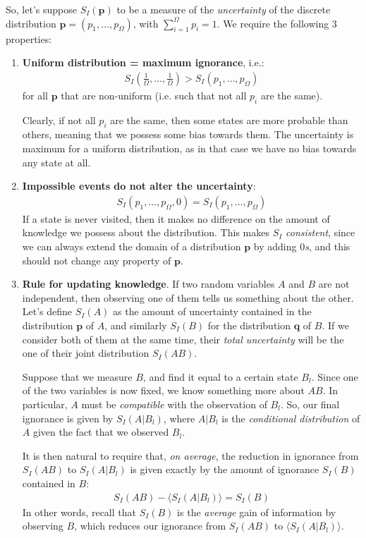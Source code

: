 \documentclass[../../main.tex]{subfiles}
\begin{document}
So, let's suppose $S_I(\bm{p})$ to be a measure of the \textit{uncertainty} of the discrete distribution $\bm{p} = (p_1, \dots, p_\Omega)$, with $\sum_{i=1}^{\Omega} p_i = 1$. We require the following $3$ properties:
\begin{enumerate}
    \item \textbf{Uniform distribution = maximum ignorance}, i.e.:
    \begin{align} \label{eqn:key1}
        \displaystyle S_I \left(\frac{1}{\Omega}, \dots, \frac{1}{\Omega}  \right) > S_I (p_1, \dots, p_{\Omega})
    \end{align}
     for all $\bm{p}$ that are non-uniform (i.e. such that not all $p_i$ are the same).  

    \medskip

    Clearly, if not all $p_i$ are the same, then some states are more probable than others, meaning that we possess some bias towards them. The uncertainty is maximum for a uniform distribution, as in that case we have no bias towards any state at all.

    \item \textbf{Impossible events do not alter the uncertainty}:
    \begin{align*}
        S_I(p_1, \dots, p_{\Omega},0) = S_I(p_1, \dots, p_{\Omega})
    \end{align*} 
    If a state is never visited, then it makes no difference on the amount of knowledge we possess about the distribution. This makes $S_I$ \textit{consistent}, since we can always extend the domain of a distribution $\bm{p}$ by adding $0$\textit{s}, and this should not change any property of $\bm{p}$.

    \item \textbf{Rule for updating knowledge}. If two random variables $A$ and $B$ are not independent, then observing one of them tells us something about the other. Let's define $S_I(A)$ as the amount of uncertainty contained in the distribution $\bm{p}$ of $A$, and similarly $S_I(B)$ for the distribution $\bm{q}$ of $B$. If we consider both of them at the same time, their \textit{total uncertainty} will be the one of their joint distribution $S_I(AB)$.
    
    Suppose that we measure $B$, and find it equal to a certain state $B_l$. Since one of the two variables is now fixed, we know something more about $AB$. In particular, $A$ must be \textit{compatible} with the observation of $B_l$. So, our final ignorance is given by $S_I(A|B_l)$, where $A|B_l$ is the \textit{conditional distribution} of $A$ given the fact that we observed $B_l$.

    It is then natural to require that, \textit{on average}, the reduction in ignorance from $S_I(AB)$ to $S_I(A|B_l)$ is given exactly by the amount of ignorance $S_I(B)$ contained in $B$:
    \begin{align*}
        S_I(AB) - \langle S_I(A|B_l) \rangle = S_I(B)
    \end{align*}
    In other words, recall that $S_I(B)$ is the \textit{average} gain of information by observing $B$, which reduces our ignorance from $S_I(AB)$ to $\langle S_I(A|B_l)\rangle$.
\end{enumerate}
\end{document}
